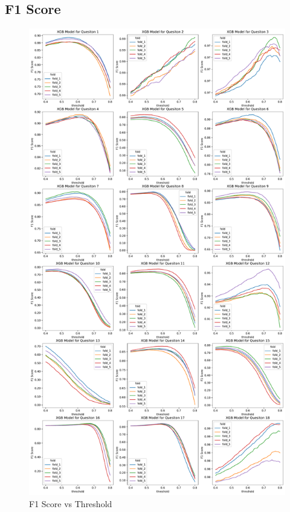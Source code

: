 \documentclass[11pt,a4paper]{article}
\begin{document}
    \subsection{F1 Score}
    \begin{figure}[H]
        \centering
        \includegraphics[height = 0.9\textheight]{model_plot/f1_threshold.pdf}
        \caption{F1 Score vs Threshold}
        \label{fig:f1_score}
    \end{figure}
\end{document}
